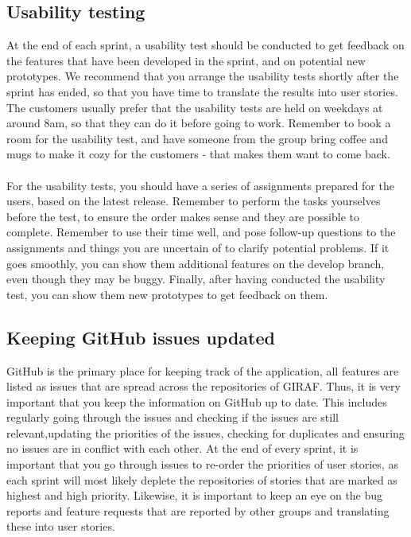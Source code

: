 \subsection{Usability testing}
At the end of each sprint, a usability test should be conducted to get feedback on the features that have been developed in the sprint, and on potential new prototypes.
We recommend that you arrange the usability tests shortly after the sprint has ended, so that you have time to translate the results into user stories.
The customers usually prefer that the usability tests are held on weekdays at around 8am, so that they can do it before going to work.
Remember to book a room for the usability test, and have someone from the group bring coffee and mugs to make it cozy for the customers - that makes them want to come back.
\\\\
For the usability tests, you should have a series of assignments prepared for the users, based on the latest release.
Remember to perform the tasks yourselves before the test, to ensure the order makes sense and they are possible to complete.
Remember to use their time well, and pose follow-up questions to the assignments and things you are uncertain of to clarify potential problems.
If it goes smoothly, you can show them additional features on the develop branch, even though they may be buggy.
Finally, after having conducted the usability test, you can show them new prototypes to get feedback on them. 

\subsection{Keeping GitHub issues updated}
GitHub is the primary place for keeping track of the application, all features are listed as issues that are spread across the repositories of GIRAF.
Thus, it is very important that you keep the information on GitHub up to date.
This includes regularly going through the issues and checking if the issues are still relevant,updating the priorities of the issues, checking for duplicates and ensuring no issues are in conflict with each other. 
At the end of every sprint, it is important that you go through issues to re-order the priorities of user stories, as each sprint will most likely deplete the repositories of stories that are marked as highest and high priority.
Likewise, it is important to keep an eye on the bug reports and feature requests that are reported by other groups and translating these into user stories.

